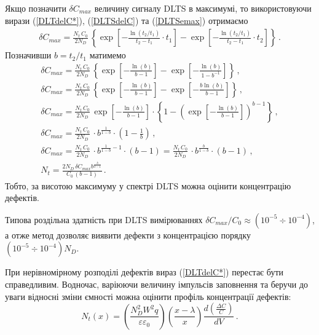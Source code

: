 \documentclass[10pt,a5paper,titlepage,oneside]{book}
\numberwithin{equation}{part}
\begin{document}
Якщо позначити $\delta C_{max}$ величину сигналу DLTS в максимумі,
то використовуючи вирази (\ref{DLTdelC*}), (\ref{DLTSdelC}) та (\ref{DLTSemax}) отримаємо
\begin{gather*}
  \delta C_{max}=\frac{N_t\,C_0}{2N_D}\,\left\{\exp\left[-\frac{\ln\left(t_2/t_1\right)}{t_2-t_1}\cdot t_1\right]
     -\exp\left[-\frac{\ln\left(t_2/t_1\right)}{t_2-t_1}\cdot t_2\right]\right\}\,.\nonumber
\end{gather*}
Позначивши $b=t_2/t_1$ матимемо
\begin{gather}
  \delta C_{max}=\frac{N_t\,C_0}{2N_D}\,\left\{\exp\left[-\frac{\ln\left(b\right)}{b-1}\right]
     -\exp\left[-\frac{\ln\left(b\right)}{1-b^{-1}} \right]\right\}\,,\nonumber\\
  \delta C_{max}=\frac{N_t\,C_0}{2N_D}\,\left\{\exp\left[-\frac{\ln\left(b\right)}{b-1}\right]
     -\exp\left[-\frac{b\ln\left(b\right)}{b-1} \right]\right\}\,,\nonumber\\
  \delta C_{max}=\frac{N_t\,C_0}{2N_D}\,\exp\left[-\frac{\ln\left(b\right)}{b-1}\right]\cdot
  \left\{1 -\left(\exp\left[-\frac{\ln\left(b\right)}{b-1} \right]\right)^{b-1}\right\}\,,\nonumber  \\
  \delta C_{max}=\frac{N_t\,C_0}{2N_D}\,\cdot b^{\frac{1}{1-b}}\cdot
  \left(1-\frac{1}{b}\right)\,,\nonumber     \\
    \delta C_{max}=\frac{N_t\,C_0}{2N_D}\,\cdot b^{\frac{1}{1-b}-1}\cdot \left(b-1\right)
                  =\frac{N_t\,C_0}{2N_D}\,\cdot b^{\frac{b}{1-b}}\cdot \left(b-1\right)\,,\nonumber \\
    N_t=\frac{2N_D\,\delta C_{max}b^{\frac{b}{b-1}}}{C_0\,(b-1)}\,.
\end{gather}
Тобто, за висотою максимуму у спектрі DLTS можна  оцінити концентрацію дефектів.

Типова роздільна здатність при DLTS вимірюваннях $\delta C_{max}/C_0\approx(10^{-5}\div 10^{-4})$,
а отже метод дозволяє виявити дефекти з концентрацією порядку $(10^{-5}\div 10^{-4})N_D$.


При нерівномірному розподілі дефектів вираз (\ref{DLTdelC*}) перестає бути справедливим.
Водночас, варіюючи величину імпульсів заповнення та беручи до уваги відносні зміни ємності
можна оцінити профіль концентрації дефектів:
\begin{equation}
\label{DLTSNt}
N_t(x)=\left(\frac{N_D^2W^2q}{\varepsilon\varepsilon_0}\right)\left(\frac{x-\lambda}{x}\right)\frac{d\left(\frac{\Delta C}{C}\right)}{dV}\,.
\end{equation}
\end{document}
